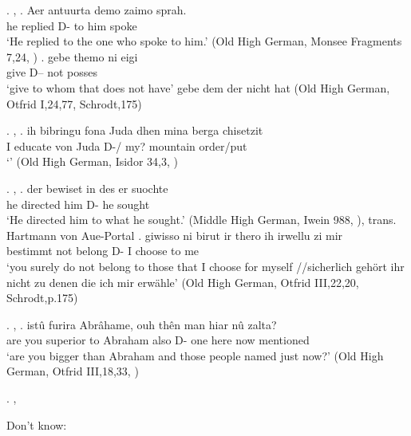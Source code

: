 \ex. , 
\ag. Aer antuurta demo zaimo sprah.\\
he replied\scsub{[dat]} D- {to him} spoke\scsub{[nom]}\\
`He replied to the one who spoke to him.' \hfill (Old High German, Monsee Fragments 7,24, \citealt[761]{behaghel1923})
\bg. gebe themo ni eigi\\
 give\scsub{[dat]} D-- not posses\scsub{[nom]}\\
 `give to whom that does not have' gebe dem der nicht hat \hfill (Old High German, Otfrid I,24,77, Schrodt,175)

\ex. , 
\ag. ih bibringu fona Juda dhen mina berga chisetzit\\
  I educate von Juda D-/ my? mountain order/put\\
  `' \hfill (Old High German, Isidor 34,3, \citealt[761]{behaghel1923})

\ex. , 
\ag. der bewiset in des er suochte\\
 he directed\scsub{[gen]} him D- he sought\scsub{[acc]}\\
 `He directed him to what he sought.' \hfill (Middle High German, Iwein 988, \citealt[761]{behaghel1923}), trans. Hartmann von Aue-Portal
\bg. giwisso ni birut ir thero ih irwellu zi mir\\
 bestimmt not belong\scsub{[gen]}  D- I choose\scsub{[acc]} to me\\
 `you surely do not belong to those that I choose for myself //sicherlich gehört ihr nicht zu denen die ich mir erwähle' \hfill (Old High German, Otfrid III,22,20, Schrodt,p.175)

\ex. , 
\ag. istû furira Abrâhame, ouh thên man hiar nû zalta?\\
 {are you} {superior to}\scsub{[dat]} Abraham also D- one here now mentioned\scsub{[acc]}\\
 `are you bigger than Abraham and those people named just now?' \hfill (Old High German, Otfrid III,18,33, \citealt[761]{behaghel1923})

\ex. , 







Don't know:

